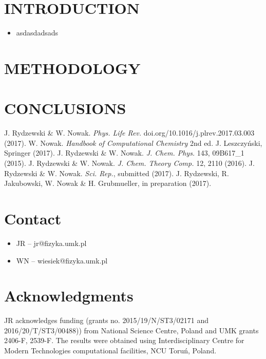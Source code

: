 \documentclass[a0]{a0poster}
\newcommand{\bi}{\item[\color{myblue}\ding{108}]}
\begin{document}
\begin{multicols}{2}

\section*{\centering\color{myblue} INTRODUCTION}

\begin{itemize}
	\bi asdasdadsads
\end{itemize}

\section*{\centering\color{myblue} METHODOLOGY}

\section*{\centering\color{myblue} CONCLUSIONS}

\color{myblue}
\begin{thebibliography}{6}%
\color{black}
 J. Rydzewski \& W. Nowak. \textit{Phys. Life Rev.} doi.org/10.1016/j.plrev.2017.03.003 (2017).
 W. Nowak. \textit{Handbook of Computational Chemistry} 2nd ed. J. Leszczyński, Springer (2017).
 J. Rydzewski \& W. Nowak. \textit{J. Chem. Phys.} 143, 09B617\_1 (2015).
 J. Rydzewski \& W. Nowak. \textit{J. Chem. Theory Comp.} 12, 2110 (2016).
 J. Rydzewski \& W. Nowak. \textit{Sci. Rep.}, submitted (2017).
 J. Rydzewski, R. Jakubowski, W. Nowak \& H. Grubmueller, in preparation (2017).
\end{thebibliography}
\color{black}

\section*{\color{myblue} Contact}
\begin{itemize}
		\bi JR -- jr@fizyka.umk.pl
		\bi WN -- wiesiek@fizyka.umk.pl
\end{itemize}

\section*{\color{myblue} Acknowledgments}
JR acknowledges funding (grants no. 2015/19/N/ST3/02171 and 2016/20/T/ST3/00488)) from National Science Centre, Poland and UMK grants 2406-F, 2539-F. The results were obtained using Interdisciplinary Centre for Modern Technologies computational facilities, NCU Toruń, Poland.

\end{multicols}
\end{document}

